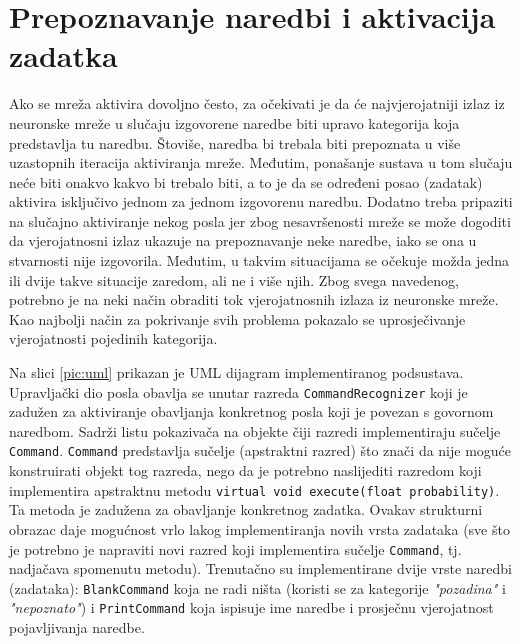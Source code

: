 \section{Prepoznavanje naredbi i aktivacija zadatka}
\label{sec:prepoy}

Ako se mreža aktivira dovoljno često, za očekivati je da će najvjerojatniji izlaz iz 
neuronske mreže u slučaju izgovorene naredbe biti upravo kategorija koja predstavlja tu naredbu. 
Štoviše, naredba bi trebala biti prepoznata u više uzastopnih iteracija aktiviranja mreže.
Međutim, ponašanje sustava u tom slučaju neće biti onakvo kakvo bi trebalo biti, a to je da se
određeni posao (zadatak) aktivira isključivo jednom za jednom izgovorenu naredbu. 
Dodatno treba pripaziti na slučajno aktiviranje nekog posla jer zbog
nesavršenosti mreže se može dogoditi da vjerojatnosni izlaz ukazuje na prepoznavanje neke
naredbe, iako se ona u stvarnosti nije izgovorila. Međutim, u takvim situacijama se očekuje možda jedna ili dvije takve situacije zaredom,
ali ne i više njih. Zbog svega navedenog, potrebno je na neki način obraditi tok vjerojatnosnih
izlaza iz neuronske mreže. Kao najbolji način za pokrivanje svih problema pokazalo se 
uprosječivanje vjerojatnosti pojedinih kategorija. 

Na slici \ref{pic:uml} prikazan je UML dijagram implementiranog podsustava. Upravljački dio posla
obavlja se unutar razreda \texttt{CommandRecognizer} koji je zadužen za aktiviranje obavljanja 
konkretnog posla koji je povezan s govornom naredbom. 
Sadrži listu pokazivača na objekte čiji razredi implementiraju 
sučelje \texttt{Command}. \texttt{Command} predstavlja sučelje (apstraktni razred) što znači da
nije moguće konstruirati objekt tog razreda, nego da je potrebno naslijediti razredom koji 
implementira apstraktnu metodu \texttt{virtual void execute(float probability)}. Ta 
metoda je zadužena za obavljanje konkretnog zadatka. Ovakav strukturni
obrazac daje mogućnost vrlo lakog implementiranja novih vrsta zadataka (sve što je potrebno je 
napraviti novi razred koji implementira sučelje \texttt{Command}, tj. nadjačava
spomenutu metodu). Trenutačno su implementirane
dvije vrste naredbi (zadataka): \texttt{BlankCommand} koja ne radi ništa (koristi se za kategorije
\textit{"pozadina"} i \textit{"nepoznato"}) i \texttt{PrintCommand} koja ispisuje ime naredbe i prosječnu 
vjerojatnost pojavljivanja naredbe.

